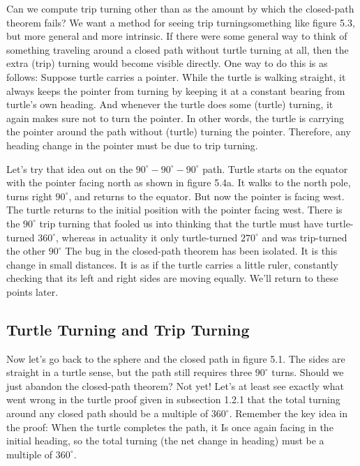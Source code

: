 \documentclass{book}
\begin{document}
Can we compute trip turning other than as the amount by which the
closed-path theorem fails? We want a method for seeing trip turningsomething like figure 5.3, but more general and more intrinsic. If there
were some general way to think of something traveling around a closed
path without turtle turning at all, then the extra (trip) turning would
become visible directly. One way to do this is as follows: Suppose turtle
carries a pointer. While the turtle is walking straight, it always keeps the
pointer from turning by keeping it at a constant bearing from turtle's
own heading. And whenever the turtle does some (turtle) turning, it
again makes sure not to turn the pointer. In other words, the turtle
is carrying the pointer around the path without (turtle) turning the
pointer. Therefore, any heading change in the pointer must be due to
trip turning.

Let's try that idea out on the $90^{\circ}-90^{\circ}-90^{\circ}$ path. Turtle starts on the
equator with the pointer facing north as shown in figure 5.4a. It walks
to the north pole, turns right $90^{\circ}$, and returns to the equator. But now
the pointer is facing west. The turtle returns to the initial position with
the pointer facing west. There is the $90^{\circ}$ trip turning that fooled us
into thinking that the turtle must have turtle-turned $360^{\circ}$, whereas in
actuality it only turtle-turned $270^{\circ}$ and was trip-turned the other $90^{\circ}$
The bug in the closed-path theorem has been isolated. It is this change in
small distances. It is as if the turtle carries a little ruler, constantly
checking that its left and right sides are moving equally. We'll return
to these points later.

\subsection{Turtle Turning and Trip Turning}

Now let's go back to the sphere and the closed path in figure 5.1. The
sides are straight in a turtle sense, but the path still requires three
$90^{\circ}$ turns. Should we just abandon the closed-path theorem? Not yet!
Let's at least see exactly what went wrong in the turtle proof given in
subsection 1.2.1 that the total turning around any closed path should
be a multiple of $360^{\circ}$. Remember the key idea in the proof: When the
turtle completes the path, it Is once again facing in the initial heading,
so the total turning (the net change in heading) must be a multiple of
$360^{\circ}$.
\end{document}
